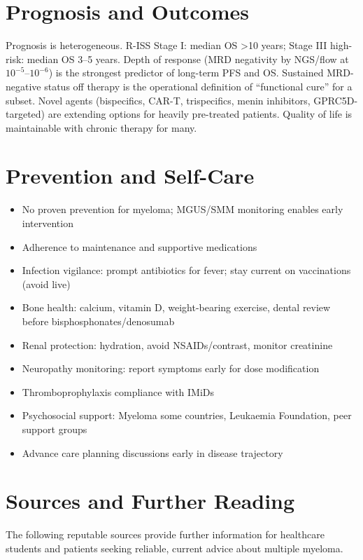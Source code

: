 \section*{Prognosis and Outcomes}
Prognosis is heterogeneous. R-ISS Stage I: median OS >10 years; Stage III high-risk: median OS 3--5 years. Depth of response (MRD negativity by NGS/flow at $10^{-5}$--$10^{-6}$) is the strongest predictor of long-term PFS and OS. Sustained MRD-negative status off therapy is the operational definition of ``functional cure'' for a subset. Novel agents (bispecifics, CAR-T, trispecifics, menin inhibitors, GPRC5D-targeted) are extending options for heavily pre-treated patients. Quality of life is maintainable with chronic therapy for many.

\section*{Prevention and Self-Care}
\begin{itemize}
    \item No proven prevention for myeloma; MGUS/SMM monitoring enables early intervention
    \item Adherence to maintenance and supportive medications
    \item Infection vigilance: prompt antibiotics for fever; stay current on vaccinations (avoid live)
    \item Bone health: calcium, vitamin D, weight-bearing exercise, dental review before bisphosphonates/denosumab
    \item Renal protection: hydration, avoid NSAIDs/contrast, monitor creatinine
    \item Neuropathy monitoring: report symptoms early for dose modification
    \item Thromboprophylaxis compliance with IMiDs
    \item Psychosocial support: Myeloma some countries, Leukaemia Foundation, peer support groups
    \item Advance care planning discussions early in disease trajectory
\end{itemize}

\section*{Sources and Further Reading}
The following reputable sources provide further information for healthcare students and patients seeking reliable, current advice about multiple myeloma.

